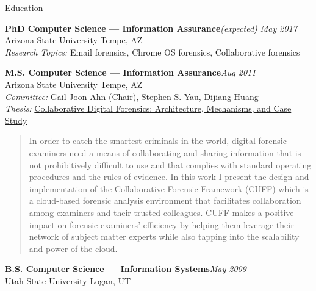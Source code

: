 
\begin{rSection}{Education}

\textbf{PhD Computer Science --- Information Assurance}\hfill \emph{(expected) May 2017}\\
Arizona State University \hfill {Tempe, AZ}\\
\textit{Research Topics:} Email forensics, Chrome OS forensics, Collaborative forensics

\textbf{M.S. Computer Science --- Information Assurance}\hfill \emph{Aug 2011}\\
Arizona State University \hfill {Tempe, AZ}\\
\textit{Committee:} Gail-Joon Ahn (Chair), Stephen S. Yau, Dijiang Huang\\
\textit{Thesis:} \href{http://repository.asu.edu/attachments/56996/content/Mabey_asu_0010N_10959.pdf}{Collaborative Digital Forensics: Architecture, Mechanisms, and Case Study}\\
\begin{quote}
  \vspace{-3ex}
  In order to catch the smartest criminals in the world, digital forensic examiners need a means of collaborating and sharing information that is not prohibitively difficult to use and that complies with standard operating procedures and the rules of evidence. In this work I present the design and implementation of the Collaborative Forensic Framework (CUFF) which is a cloud-based forensic analysis environment that facilitates collaboration among examiners and their trusted colleagues. CUFF makes a positive impact on forensic examiners' efficiency by helping them leverage their network of subject matter experts while also tapping into the scalability and power of the cloud.
\end{quote}

\textbf{B.S. Computer Science --- Information Systems}\hfill \emph{May 2009}\\
Utah State University \hfill {Logan, UT}

\end{rSection}

